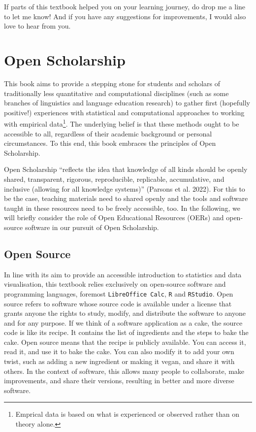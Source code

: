 \documentclass[
  letterpaper,
  DIV=11,
  numbers=noendperiod]{scrreprt}
\begin{document}
If parts of this textbook helped you on your learning journey, do drop
me a line to let me know! And if you have any suggestions for
improvements, I would also love to hear from you.


\chapter{Open Scholarship}\label{open-scholarship}

This book aims to provide a stepping stone for students and scholars of
traditionally less quantitative and computational disciplines (such as
some branches of linguistics and language education research) to gather
first (hopefully positive!) experiences with statistical and
computational approaches to working with empirical data\footnote{Emprical
  data is based on what is experienced or observed rather than on theory
  alone.}. The underlying belief is that these methods ought to be
accessible to all, regardless of their academic background or personal
circumstances. To this end, this book embraces the principles of Open
Scholarship.

Open Scholarship ``reflects the idea that knowledge of all kinds should
be openly shared, transparent, rigorous, reproducible, replicable,
accumulative, and inclusive (allowing for all knowledge systems)''
(Parsons et al. 2022). For this to be the case, teaching materials need
to shared openly and the tools and software taught in these resources
need to be freely accessible, too. In the following, we will briefly
consider the role of Open Educational Resources (OERs) and open-source
software in our pursuit of Open Scholarship.

\section{Open Source}\label{open-source}

In line with its aim to provide an accessible introduction to statistics
and data visualisation, this textbook relies exclusively on open-source
software and programming languages, foremost \texttt{LibreOffice\ Calc},
\texttt{R} and \texttt{RStudio}. Open source refers to software whose
source code is available under a license that grants anyone the rights
to study, modify, and distribute the software to anyone and for any
purpose. If we think of a software application as a cake, the source
code is like its recipe. It contains the list of ingredients and the
steps to bake the cake. Open source means that the recipe is publicly
available. You can access it, read it, and use it to bake the cake. You
can also modify it to add your own twist, such as adding a new
ingredient or making it vegan, and share it with others. In the context
of software, this allows many people to collaborate, make improvements,
and share their versions, resulting in better and more diverse software.
\end{document}
